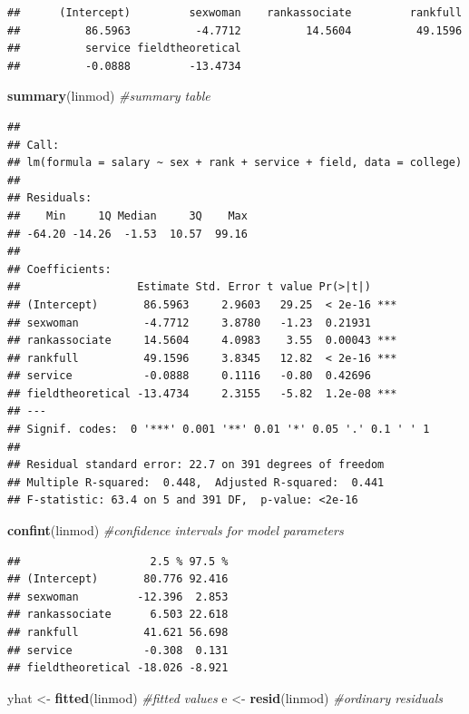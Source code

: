 \documentclass[
  11pt,
  letterpaper,
]{book}
\newenvironment{Shaded}{\begin{snugshade}}{\end{snugshade}}
\newcommand{\CommentTok}[1]{\textcolor[rgb]{0.56,0.35,0.01}{\textit{#1}}}
\newcommand{\KeywordTok}[1]{\textcolor[rgb]{0.13,0.29,0.53}{\textbf{#1}}}
\newcommand{\NormalTok}[1]{#1}
\newcommand{\StringTok}[1]{\textcolor[rgb]{0.31,0.60,0.02}{#1}}
\theoremstyle{definition}
\theoremstyle{definition}
\theoremstyle{definition}
\theoremstyle{remark}
\begin{document}
\begin{verbatim}
##      (Intercept)         sexwoman    rankassociate         rankfull 
##          86.5963          -4.7712          14.5604          49.1596 
##          service fieldtheoretical 
##          -0.0888         -13.4734
\end{verbatim}

\begin{Shaded}
\begin{Highlighting}[]
\KeywordTok{summary}\NormalTok{(linmod) }\CommentTok{\#summary table}
\end{Highlighting}
\end{Shaded}

\begin{verbatim}
## 
## Call:
## lm(formula = salary ~ sex + rank + service + field, data = college)
## 
## Residuals:
##    Min     1Q Median     3Q    Max 
## -64.20 -14.26  -1.53  10.57  99.16 
## 
## Coefficients:
##                  Estimate Std. Error t value Pr(>|t|)    
## (Intercept)       86.5963     2.9603   29.25  < 2e-16 ***
## sexwoman          -4.7712     3.8780   -1.23  0.21931    
## rankassociate     14.5604     4.0983    3.55  0.00043 ***
## rankfull          49.1596     3.8345   12.82  < 2e-16 ***
## service           -0.0888     0.1116   -0.80  0.42696    
## fieldtheoretical -13.4734     2.3155   -5.82  1.2e-08 ***
## ---
## Signif. codes:  0 '***' 0.001 '**' 0.01 '*' 0.05 '.' 0.1 ' ' 1
## 
## Residual standard error: 22.7 on 391 degrees of freedom
## Multiple R-squared:  0.448,	Adjusted R-squared:  0.441 
## F-statistic: 63.4 on 5 and 391 DF,  p-value: <2e-16
\end{verbatim}

\begin{Shaded}
\begin{Highlighting}[]
\KeywordTok{confint}\NormalTok{(linmod) }\CommentTok{\#confidence intervals for model parameters}
\end{Highlighting}
\end{Shaded}

\begin{verbatim}
##                    2.5 % 97.5 %
## (Intercept)       80.776 92.416
## sexwoman         -12.396  2.853
## rankassociate      6.503 22.618
## rankfull          41.621 56.698
## service           -0.308  0.131
## fieldtheoretical -18.026 -8.921
\end{verbatim}

\begin{Shaded}
\begin{Highlighting}[]
\NormalTok{yhat \textless{}{-}}\StringTok{ }\KeywordTok{fitted}\NormalTok{(linmod) }\CommentTok{\#fitted values}
\NormalTok{e \textless{}{-}}\StringTok{ }\KeywordTok{resid}\NormalTok{(linmod) }\CommentTok{\#ordinary residuals}
\end{Highlighting}
\end{Shaded}


  
\end{document}
